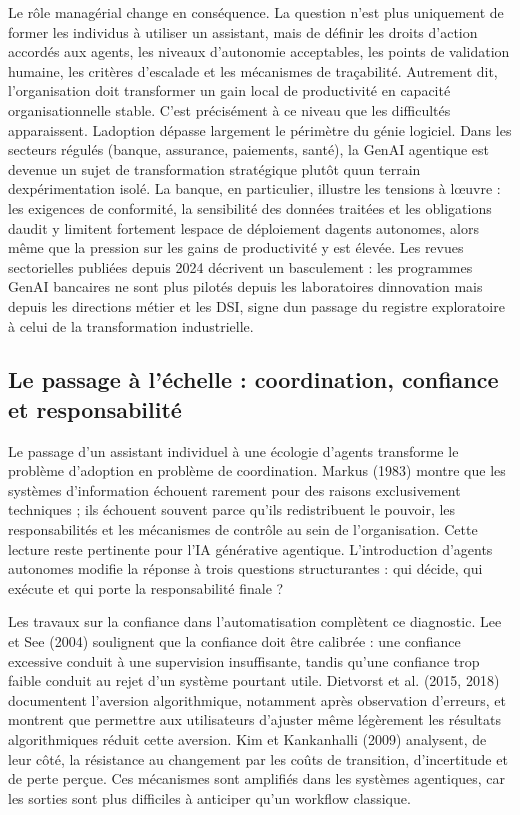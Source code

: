 Le rôle managérial change en conséquence. La question n'est plus uniquement de former les individus à utiliser un assistant, mais de définir les droits d'action accordés aux agents, les niveaux d'autonomie acceptables, les points de validation humaine, les critères d'escalade et les mécanismes de traçabilité. Autrement dit, l'organisation doit transformer un gain local de productivité en capacité organisationnelle stable. C'est précisément à ce niveau que les difficultés apparaissent.
L\textquotesingle adoption dépasse largement le périmètre du génie
logiciel. Dans les secteurs régulés (banque, assurance, paiements, santé),
la GenAI agentique est devenue un sujet de transformation stratégique
plutôt qu\textquotesingle un terrain d\textquotesingle expérimentation
isolé. La banque, en particulier, illustre les tensions à
l\textquotesingle\oe{}uvre : les exigences de conformité, la sensibilité
des données traitées et les obligations d\textquotesingle audit y
limitent fortement l\textquotesingle espace de déploiement
d\textquotesingle agents autonomes, alors même que la pression sur les
gains de productivité y est élevée. Les revues sectorielles publiées
depuis 2024 décrivent un basculement : les programmes GenAI bancaires
ne sont plus pilotés depuis les laboratoires
d\textquotesingle innovation mais depuis les directions métier et les
DSI, signe d\textquotesingle un passage du registre exploratoire à
celui de la transformation industrielle.

\subsection{Le passage à l'échelle : coordination, confiance et responsabilité}\label{le-passage-uxe0-luxe9chelle-coordination-confiance-et-responsabilituxe9}

Le passage d'un assistant individuel à une écologie d'agents transforme le problème d'adoption en problème de coordination. Markus (1983) montre que les systèmes d'information échouent rarement pour des raisons exclusivement techniques ; ils échouent souvent parce qu'ils redistribuent le pouvoir, les responsabilités et les mécanismes de contrôle au sein de l'organisation. Cette lecture reste pertinente pour l'IA générative agentique. L'introduction d'agents autonomes modifie la réponse à trois questions structurantes : qui décide, qui exécute et qui porte la responsabilité finale ?

Les travaux sur la confiance dans l'automatisation complètent ce diagnostic. Lee et See (2004) soulignent que la confiance doit être calibrée : une confiance excessive conduit à une supervision insuffisante, tandis qu'une confiance trop faible conduit au rejet d'un système pourtant utile. Dietvorst et al. (2015, 2018) documentent l'aversion algorithmique, notamment après observation d'erreurs, et montrent que permettre aux utilisateurs d'ajuster même légèrement les résultats algorithmiques réduit cette aversion. Kim et Kankanhalli (2009) analysent, de leur côté, la résistance au changement par les coûts de transition, d'incertitude et de perte perçue. Ces mécanismes sont amplifiés dans les systèmes agentiques, car les sorties sont plus difficiles à anticiper qu'un workflow classique.

